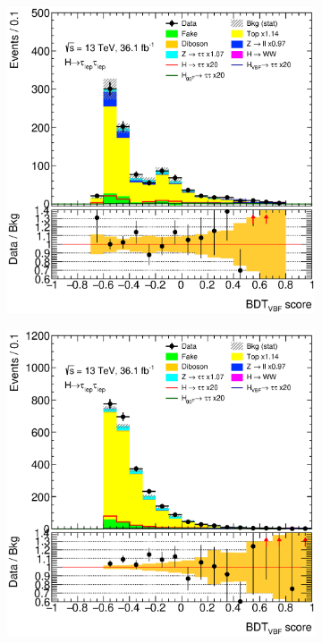 \begin{figure}[htb]
    \centering
    \begin{subfigure}[t]{0.45\textwidth}
        \includegraphics[width=\textwidth]{./plots/mva/modeling/BDT/CRs/eemm-CutMVAVBFCatTopCR-BDT_VBF_CR-lin.eps}
    \end{subfigure}
    \begin{subfigure}[t]{0.45\textwidth}
        \includegraphics[width=\textwidth]{./plots/mva/modeling/BDT/CRs/emme-CutMVAVBFCatTopCR-BDT_VBF_CR-lin.eps}

\end{subfigure}
\end{figure}
